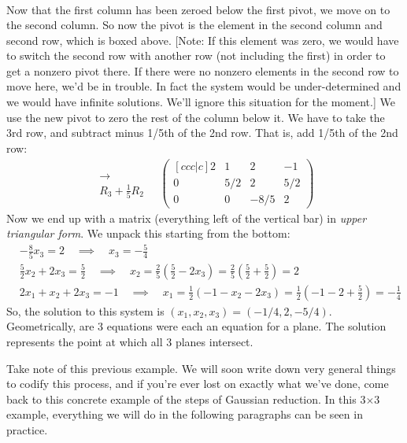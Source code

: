 {\begin{align*}
    \end{align*}
    Now that the first column has been zeroed below the first pivot, we move on to the second column. So now the pivot is the element in the second column and second row, which is boxed above. [Note: If this element was zero, we would have to switch the second row with another row (not including the first) in order to get a nonzero pivot there. If there were no nonzero elements in the second row to move here, we'd be in trouble. In fact the system would be under-determined and we would have infinite solutions. We'll ignore this situation for the moment.] We use the new pivot to zero the rest of the column below it. We have to take the 3rd row, and subtract minus 1/5th of the 2nd row. That is, add 1/5th of the 2nd row:
	\begin{align*}
    \begin{matrix}
     \\
    \to \\
    R_3 + \frac{1}{5}R_2
    \end{matrix}
    \quad
    \begin{pmatrix}[ccc|c]
    2 &    1 &    2 &  -1 \\
    0 &  5/2 &    2 & 5/2 \\
    0 &    0 & -8/5 &   2
    \end{pmatrix}
    \end{align*}
    Now we end up with a matrix (everything left of the vertical bar) in \textit{upper triangular form}. We unpack this starting from the bottom:
    \begin{align*}
    & -\frac{8}{5} x_3 = 2 \quad \implies \quad x_3 = -\frac{5}{4} \\
    & \frac{5}{2} x_2 + 2 x_3 = \frac{5}{2} \quad \implies \quad x_2 = \frac{2}{5}\left(\frac{5}{2} - 2 x_3\right)  = \frac{2}{5}\left(\frac{5}{2} + \frac{5}{2}\right) = 2 \\
    & 2 x_1 + x_2 + 2 x_3 = -1 \quad \implies \quad x_1 = \frac{1}{2}\left(-1 - x_2 - 2 x_3 \right) = \frac{1}{2}\left(-1 - 2 + \frac{5}{2}\right) = -\frac{1}{4}
    \end{align*}
    So, the solution to this system is $(x_1, x_2, x_3) = (-1/4, 2, -5/4)$. Geometrically, are 3 equations were each an equation for a plane. The solution represents the point at which all 3 planes intersect.
}{\downline}

Take note of this previous example. We will soon write down very general things to codify this process, and if you're ever lost on exactly what we've done, come back to this concrete example of the steps of Gaussian reduction. In this 3$\times$3 example, everything we will do in the following paragraphs can be seen in practice.

